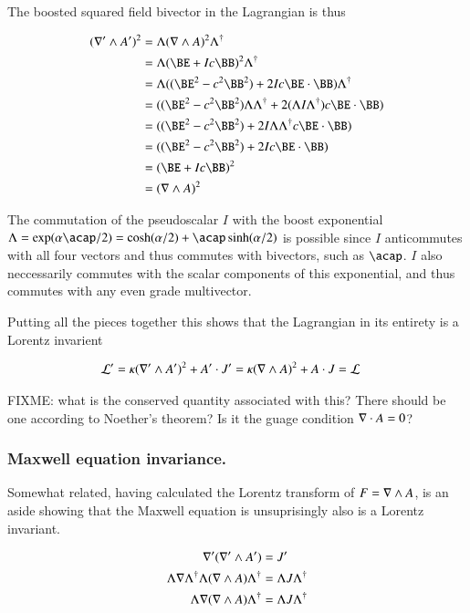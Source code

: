 \documentclass{article}
\begin{document}
The boosted squared field bivector in the Lagrangian is thus

\begin{align*}
(\grad' \wedge A' )^2
&= \Lambda (\grad \wedge A)^2 \Lambda^\dagger \\
&= \Lambda (\BE + Ic\BB)^2 \Lambda^\dagger \\
&= \Lambda ( (\BE^2 - c^2\BB^2) + 2 I c \BE \cdot \BB ) \Lambda^\dagger \\
&= ( (\BE^2 - c^2\BB^2) \Lambda \Lambda^\dagger + 2 (\Lambda I \Lambda^\dagger) c \BE \cdot \BB ) \\
&= ( (\BE^2 - c^2\BB^2) + 2 I \Lambda \Lambda^\dagger c \BE \cdot \BB ) \\
&= ( (\BE^2 - c^2\BB^2) + 2 I c \BE \cdot \BB ) \\
&= (\BE + Ic\BB)^2 \\
&= (\grad \wedge A )^2
\end{align*}

The commutation of the pseudoscalar $I$ with the boost exponential $\Lambda = \exp( \alpha \acap/2 ) = \cosh(\alpha/2) + \acap\sinh(\alpha/2)$ is possible
since $I$
anticommutes with all four vectors and thus commutes with bivectors, such as $\acap$.  $I$ also neccessarily commutes with the scalar
components of this exponential, and thus commutes with any even grade multivector.

Putting all the pieces together this shows that the Lagrangian in its entirety is a Lorentz invarient

\begin{align*}
\mathcal{L}' &= \kappa (\nabla' \wedge A')^2 + A' \cdot J' = \kappa (\nabla \wedge A)^2 + A \cdot J = \mathcal{L}
\end{align*}

FIXME: what is the conserved quantity associated with this?  There should be one according to Noether's theorem?  Is it the guage condition $\nabla \cdot A = 0$?

\subsubsection{ Maxwell equation invariance. }

Somewhat related, having calculated the Lorentz transform of $F = \nabla \wedge A$, is an aside showing that the Maxwell equation
is unsuprisingly also is a Lorentz invariant.

\begin{align*}
\nabla' (\nabla' \wedge A') &= J' \\
\Lambda \nabla \Lambda^\dagger \Lambda (\nabla \wedge A) \Lambda^\dagger &= \Lambda J \Lambda^\dagger \\
\Lambda \nabla (\nabla \wedge A) \Lambda^\dagger &= \Lambda J \Lambda^\dagger \\
\end{align*}
\end{document}
